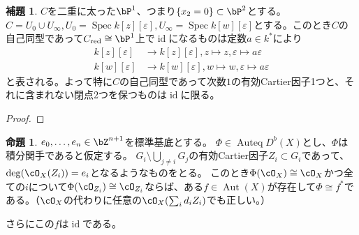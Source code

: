 \documentclass[uplatex, a4paper, dvipdfmx]{jsarticle}
\theoremstyle{definition}
\newtheorem{definition}[theorem]{定義}
\newtheorem{proposition}[theorem]{命題}
\newtheorem{lemma}[theorem]{補題}
\DeclareMathOperator{\Auteq}{\mathrm{Auteq}}
\DeclareMathOperator{\id}{\mathrm{id}}
\DeclareMathOperator{\Aut}{\mathrm{Aut}}
\DeclareMathOperator{\Spec}{\mathrm{Spec}}
\DeclareMathOperator{\red}{\mathrm{red}}
\begin{document}
\begin{lemma}\label{lem:automorphism-of-double-line}
    $C$を二重に太った$\bP^1$、つまり$\{x_2 = 0\} \subset \bP^2$とする。$C = U_0 \cup U_\infty, U_0 = \Spec k[z][\varepsilon], U_\infty = \Spec k[w][\varepsilon]$とする。このとき$C$の自己同型であって$C_{\red} \cong \bP^1$上で$\id$になるものは定数$a \in k^*$により
    \begin{align}
        k[z][\varepsilon] & \to k[z][\varepsilon], z \mapsto z, \varepsilon \mapsto a\varepsilon \\
        k[w][\varepsilon] & \to k[w][\varepsilon], w \mapsto w, \varepsilon \mapsto a\varepsilon
    \end{align}
    と表される。よって特に$C$の自己同型であって次数$1$の有効Cartier因子1つと、それに含まれない閉点2つを保つものは$\id$に限る。
\end{lemma}
\begin{proof}

\end{proof}
\begin{proposition}\label{prop:pointwise-criterion}
    $e_0, \dots, e_n \in \bZ^{n+1}$を標準基底とする。
    $\Phi \in \Auteq D^b(X)$とし、$\Phi$は積分関手であると仮定する。
    $G_i \setminus \bigcup_{j \neq i} G_j$の有効Cartier因子$Z_i \subset G_i$であって、$\deg(\cO_X(Z_i)) = e_i$となるようなものをとる。
    このとき$\Phi(\cO_X) \cong \cO_X$かつ全ての$i$について$\Phi(\cO_{Z_i}) \cong \cO_{Z_i}$ならば、ある$f \in \Aut(X)$が存在して$\Phi \cong f^*$である。（$\cO_X$の代わりに任意の$\cO_X(\sum_i d_iZ_i)$でも正しい。）

    さらにこの$f$は$\id$である。
\end{proposition}
\end{document}

